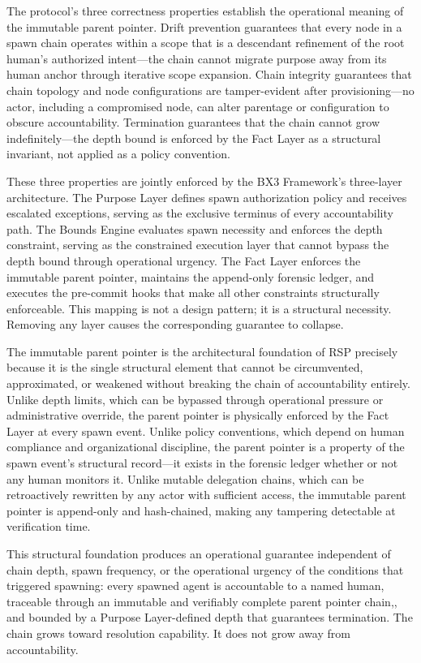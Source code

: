 The protocol's three correctness properties establish the operational meaning of the immutable parent pointer. Drift prevention guarantees that every node in a spawn chain operates within a scope that is a descendant refinement of the root human's authorized intent---the chain cannot migrate purpose away from its human anchor through iterative scope expansion. Chain integrity guarantees that chain topology and node configurations are tamper-evident after provisioning---no actor, including a compromised node, can alter parentage or configuration to obscure accountability. Termination guarantees that the chain cannot grow indefinitely---the depth bound is enforced by the Fact Layer as a structural invariant, not applied as a policy convention.

These three properties are jointly enforced by the BX3 Framework's three-layer architecture. The Purpose Layer defines spawn authorization policy and receives escalated exceptions, serving as the exclusive terminus of every accountability path. The Bounds Engine evaluates spawn necessity and enforces the depth constraint, serving as the constrained execution layer that cannot bypass the depth bound through operational urgency. The Fact Layer enforces the immutable parent pointer, maintains the append-only forensic ledger, and executes the pre-commit hooks that make all other constraints structurally enforceable. This mapping is not a design pattern; it is a structural necessity. Removing any layer causes the corresponding guarantee to collapse.

The immutable parent pointer is the architectural foundation of RSP precisely because it is the single structural element that cannot be circumvented, approximated, or weakened without breaking the chain of accountability entirely. Unlike depth limits, which can be bypassed through operational pressure or administrative override, the parent pointer is physically enforced by the Fact Layer at every spawn event. Unlike policy conventions, which depend on human compliance and organizational discipline, the parent pointer is a property of the spawn event's structural record---it exists in the forensic ledger whether or not any human monitors it. Unlike mutable delegation chains, which can be retroactively rewritten by any actor with sufficient access, the immutable parent pointer is append-only and hash-chained, making any tampering detectable at verification time.

This structural foundation produces an operational guarantee independent of chain depth, spawn frequency, or the operational urgency of the conditions that triggered spawning: every spawned agent is accountable to a named human, traceable through an immutable and verifiably complete parent pointer chain,, and bounded by a Purpose Layer-defined depth that guarantees termination. The chain grows toward resolution capability. It does not grow away from accountability.

